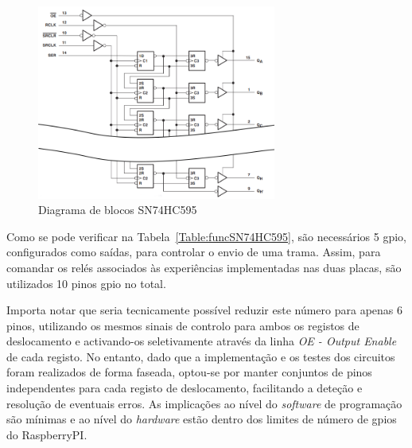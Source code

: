 \begin{figure}[hbtp]
    \centering
    \includegraphics[width=0.7\textwidth]{figures/SR_blocos.png}
    \caption{Diagrama  de blocos SN74HC595 \cite{SN74HC595}}
    \label{fig:SN74HC595blocos}
\end{figure}

Como se pode verificar na Tabela~\ref{Table:funcSN74HC595}, são necessários 5 \acrshort{gpio}, configurados como saídas, para controlar o envio de uma trama. Assim, para comandar os relés associados às experiências implementadas nas duas placas, são utilizados 10 pinos \acrshort{gpio} no total.

Importa notar que seria tecnicamente possível reduzir este número para apenas 6 pinos, utilizando os mesmos sinais de controlo para ambos os registos de deslocamento e activando-os seletivamente através da linha \textit{OE - Output Enable} de cada registo. No entanto, dado que a implementação e os testes dos circuitos foram realizados de forma faseada, optou-se por manter conjuntos de pinos independentes para cada registo de deslocamento, facilitando a deteção e resolução de eventuais erros. As implicações ao nível do \textit{software} de programação são mínimas e ao nível do \textit{hardware} estão dentro dos limites de número de \acrshort{gpio}s do \gls{RaspberryPI}.

